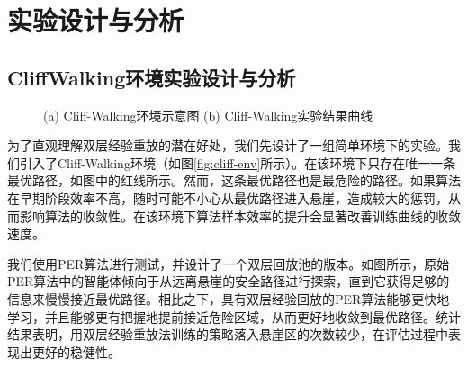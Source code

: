 \section{实验设计与分析}

\subsection{CliffWalking环境实验设计与分析}

\begin{figure}
    \centering
    \caption{(a) Cliff-Walking环境示意图 (b) Cliff-Walking实验结果曲线}
\end{figure}

为了直观理解双层经验重放的潜在好处，我们先设计了一组简单环境下的实验。我们引入了Cliff-Walking环境（如图\ref{fig:cliff-env}所示）。在该环境下只存在唯一一条最优路径，如图中的红线所示。然而，这条最优路径也是最危险的路径。如果算法在早期阶段效率不高，随时可能不小心从最优路径进入悬崖，造成较大的惩罚，从而影响算法的收敛性。在该环境下算法样本效率的提升会显著改善训练曲线的收敛速度。

我们使用PER算法进行测试，并设计了一个双层回放池的版本。如图所示，原始PER算法中的智能体倾向于从远离悬崖的安全路径进行探索，直到它获得足够的信息来慢慢接近最优路径。相比之下，具有双层经验回放的PER算法能够更快地学习，并且能够更有把握地提前接近危险区域，从而更好地收敛到最优路径。统计结果表明，用双层经验重放法训练的策略落入悬崖区的次数较少，在评估过程中表现出更好的稳健性。

